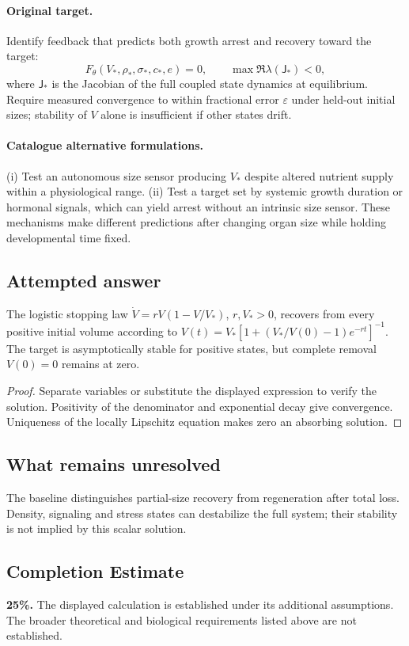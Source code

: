 \documentclass[11pt]{article}
\begin{document}
\paragraph{Original target.}
Identify feedback that predicts both growth arrest and recovery toward the target:
\[
F_\theta(V_*,\rho_*,\sigma_*,c_*,e)=0,
\qquad
\max\Re\lambda(\mathsf J_*)<0,
\]
where $\mathsf J_*$ is the Jacobian of the full coupled state dynamics at equilibrium. Require measured convergence to within fractional error $\varepsilon$ under held-out initial sizes; stability of $V$ alone is insufficient if other states drift.
\paragraph{Catalogue alternative formulations.}
(i) Test an autonomous size sensor producing $V_*$ despite altered nutrient supply within a physiological range. (ii) Test a target set by systemic growth duration or hormonal signals, which can yield arrest without an intrinsic size sensor. These mechanisms make different predictions after changing organ size while holding developmental time fixed.
\subsection{Attempted answer}
\begin{proposition}
The logistic stopping law $\dot V=rV(1-V/V_*)$, $r,V_*>0$, recovers from every positive initial volume according to $V(t)=V_*[1+(V_*/V(0)-1)e^{-rt}]^{-1}$. The target is asymptotically stable for positive states, but complete removal $V(0)=0$ remains at zero.
\end{proposition}
\begin{proof}
Separate variables or substitute the displayed expression to verify the solution. Positivity of the denominator and exponential decay give convergence. Uniqueness of the locally Lipschitz equation makes zero an absorbing solution.
\end{proof}
\subsection{What remains unresolved}
The baseline distinguishes partial-size recovery from regeneration after total loss. Density, signaling and stress states can destabilize the full system; their stability is not implied by this scalar solution.
\subsection{Completion Estimate}
\textbf{25\%.} The displayed calculation is established under its additional assumptions. The broader theoretical and biological requirements listed above are not established.
\end{document}
